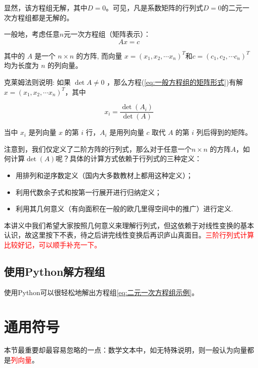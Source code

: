 显然，该方程组无解，其中$D=0$。可见，凡是系数矩阵的行列式$D=0$的二元一次方程组都是无解的。


一般地，考虑任意$n$元一次方程组（矩阵表示）：
\begin{equation}
    A x=c
\label{eq:一般方程组的矩阵形式}
\end{equation}

其中的 $A$ 是一个 $n \times n$ 的方阵, 而向量 $x=\left(x_1, x_2, \cdots x_n\right)^T$和$c=\left(c_1, c_2, \cdots c_n\right)^T$ 均为长度为 $n$ 的列向量。 

克莱姆法则说明: 如果 $\operatorname{det} A \neq 0$ ，那么方程(\ref{eq:一般方程组的矩阵形式})有解$x=\left(x_1, x_2, \cdots x_n\right)^T$，其中

$$
x_i=\frac{\operatorname{det}\left(A_i\right)}{\operatorname{det}(A)}
$$

当中 $x_i$ 是列向量 $x$ 的第 $i$ 行，$A_i$ 是用列向量 $c$ 取代 $A$ 的第 $i$ 列后得到的矩阵。

注意到，我们仅定义了二阶方阵的行列式，那么对于任意一个$n \times n$ 的方阵$A$，如何计算$\operatorname{det}(A)$呢？具体的计算方式依赖于行列式的三种定义：
\begin{itemize}
    \item 用排列和逆序数定义（国内大多数教材上都用这种定义）；
    \item 利用代数余子式和按第一行展开进行归纳定义；
    \item 利用其几何意义（有向面积在一般的欧几里得空间中的推广）进行定义.
\end{itemize}

本讲义中我们希望大家按照几何意义来理解行列式，但这依赖于对线性变换的基本认识，故这里按下不表，待之后讲完线性变换后再识庐山真面目。\textcolor{red}{三阶行列式计算比较好记，可以顺手补充一下。}

\subsection{使用Python解方程组}
\label{subsec:使用Python解方程组}

\noindent 使用Python可以很轻松地解出方程组\ref{eq:二元一次方程组示例}。



\section{通用符号}

\begin{note}
    本节最重要却最容易忽略的一点：数学文本中，如无特殊说明，则一般认为向量都是\textcolor{red}{列向量}。
\end{note}

